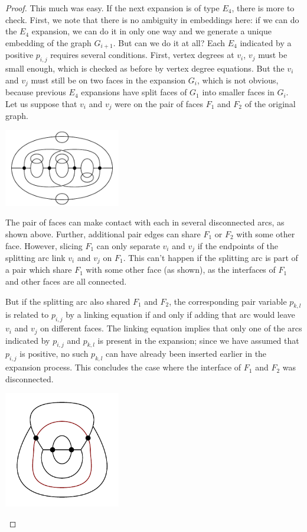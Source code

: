 \documentclass[amsmath,secnumarabic,floatfix,amssymb,nofootinbib,nobibnotes,letterpaper,11pt,tightenlines,showkeys]{revtex4}
\theoremstyle{definition}
\newcommand{\pairinsert}{E_4}
\begin{document}
\begin{proof}
This much was easy. If the next expansion is of type $\pairinsert$, there is more to check. First, we note that there is no ambiguity in embeddings here: if we can do the $\pairinsert$ expansion, we can do it in only one way and we generate a unique embedding of the graph $G_{i+1}$. But can we do it at all? Each $\pairinsert$ indicated by a positive $p_{i,j}$ requires several conditions. First, vertex degrees at $v_i$, $v_j$ must be small enough, which is checked as before by vertex degree equations. But the $v_i$ and $v_j$ must still be on two faces in the expansion $G_i$, which is not obvious, because previous $\pairinsert$ expansions have split faces of $G_1$ into smaller faces in $G_i$. Let us suppose that $v_i$ and $v_j$ were on the pair of faces $F_1$ and $F_2$ of the original graph. 
\begin{center}
\includegraphics[width=2in]{pair-interference} 
\end{center}
The pair of faces can make contact with each in several disconnected arcs, as shown above. Further, additional pair edges can share $F_1$ or $F_2$ with some other face. However, slicing $F_1$ can only separate $v_i$ and $v_j$ if the endpoints of the splitting arc link $v_i$ and $v_j$ on $F_1$. This can't happen if the splitting arc is part of a pair which share $F_1$ with some other face (as shown), as the interfaces of $F_1$ and other faces are all connected. 

But if the splitting arc also shared $F_1$ and $F_2$, the corresponding pair variable $p_{k,l}$ is related to $p_{i,j}$ by a linking equation if and only if adding that arc would leave $v_i$ and $v_j$ on different faces. The linking equation implies that only one of the arcs indicated by $p_{i,j}$ and $p_{k,l}$ is present in the expansion; since we have assumed that $p_{i,j}$ is positive, no such $p_{k,l}$ can have already been inserted earlier in the expansion process. This concludes the case where the interface of $F_1$ and $F_2$ was disconnected.

\begin{center}
\includegraphics[width=2in]{connected-pair-interaction-case}
\end{center}


\end{proof}
\end{document}
